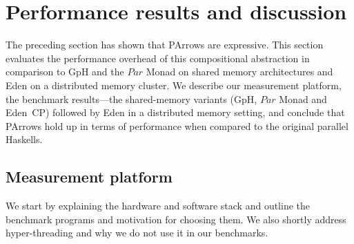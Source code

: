 \documentclass{jfp1}
\newcommand{\Conid}[1]{\mathit{#1}}
\begin{document}
	
%
\section{Performance results and discussion}
\label{sec:benchmarks}

The preceding section has shown that PArrows are expressive. This section evaluates the performance overhead of this compositional abstraction in comparison to  GpH and the \ensuremath{\Conid{Par}} Monad on shared memory architectures and Eden on  a distributed memory cluster.
We describe our measurement platform, the benchmark results---the shared-memory variants (GpH, \ensuremath{\Conid{Par}} Monad and Eden~CP) followed by Eden in a distributed memory setting, and conclude that PArrows hold up in terms of performance when compared to the original parallel Haskells.


\newcommand{\rmtest}{Rabin--Miller test\xspace}
\newcommand{\sudokutest}{Sudoku\xspace}
\newcommand{\jacobitest}{Jacobi sum test\xspace}
\newcommand{\torustest}{Gentleman\xspace}
\newlength{\plotwidthSMP}
\setlength{\plotwidthSMP}{0.39\textwidth}
\newlength{\plotwidthDist}
\setlength{\plotwidthDist}{0.6\textwidth}

\newcommand{\benchmarkDir}{benchmarks}

\newcommand{\speedupplot}[8]{
\begin{tikzpicture}
\begin{axis}[title={#1},
title style={align=center},
scale only axis, width=#7,
xlabel=Threads,
xtick distance=#4,
ytick distance=#4,
ylabel=Speedup,
ylabel near ticks,
grid=major,
legend entries={linear, #2},
legend style={at={(0.01,0.99)},anchor=north west},
max space between ticks=50pt,
grid style={line width=.1pt, draw=gray!10},
major grid style={line width=.2pt,draw=gray!50},
ymin=-1,
xmin=-1,
ymax=#8,
xmax=#6]
\addplot [domain=0:#3, no markers,dotted,thick]{x};
#5
\end{axis}
\end{tikzpicture}
}

\subsection{Measurement platform}
We start by explaining the hardware and software stack and outline the benchmark programs and motivation for choosing them. We also shortly address hyper-threading and why we do not use it in our benchmarks.
\end{document}
